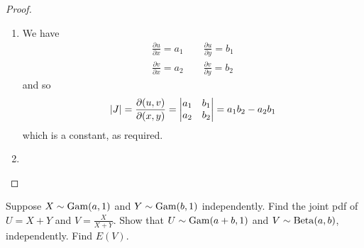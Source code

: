 \documentclass[notoc,notitlepage]{tufte-book}
\begin{document}
\begin{proof}
  \begin{enumerate}
    \item We have
      \begin{gather*}
        \frac{\partial u}{\partial x} = a_1 \qquad \frac{\partial u}{\partial y} = b_1 \\
        \frac{\partial v}{\partial x} = a_2 \qquad \frac{\partial v}{\partial y} = b_2
      \end{gather*}
      and so
      \begin{equation*}
        \left| J \right| = \frac{\partial (u, v)}{\partial (x, y)} = \begin{vmatrix}
            a_1 & b_1 \\
            a_2 & b_2
        \end{vmatrix} = a_1 b_2 - a_2 b_1
      \end{equation*}
      which is a constant, as required.

    \item {}
  \end{enumerate}
\end{proof}

\begin{eg}
  Suppose $X \sim \operatorname{Gam}(a, 1)$ and $Y \sim \operatorname{Gam}(b, 1)$ independently. Find the joint pdf of $U = X + Y$ and $V = \frac{X}{X + Y}$. Show that $U \sim \operatorname{Gam}(a + b, 1)$ and $V \sim \operatorname{Beta}(a, b)$, independently. Find $E(V)$.
\end{eg}
\end{document}
